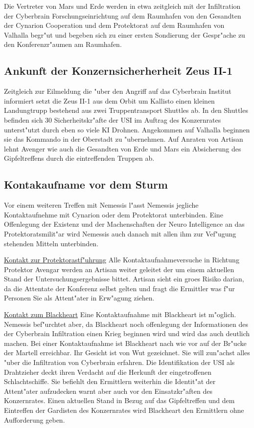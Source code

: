 Die Vertreter von Mars und Erde werden in etwa zeitgleich mit der Infiltration der Cyberbrain Forschungseinrichtung auf dem Raumhafen von den Gesandten der Cynarion Cooperation und dem Protektorat auf dem Raumhafen von Valhalla begr"u\3t und begeben sich zu einer ersten Sondierung der Gespr"ache zu den Konferenzr"aumen am Raumhafen.

\subsection{Ankunft der Konzernsicherherheit Zeus II-1}

Zeitgleich zur Eilmeldung die "uber den Angriff auf das Cyberbrain Institut informiert setzt die Zeus II-1 aus dem Orbit um Kallisto einen kleinen Landungtrupp bestehend aus zwei Truppentransport Shuttles ab. In den Shuttles befinden sich 30 Sicherheitskr"afte der USI im Auftrag des Konzernrates unterst"utzt durch eben so viele KI Drohnen. Angekommen auf Valhalla beginnen sie das Kommando in der Oberstadt zu "ubernehmen. Auf Anraten von Artisan lehnt Avenger wie auch die Gesandten von Erde und Mars ein Absicherung des Gipfeltreffens durch die eintreffenden Truppen ab.

\subsection{Kontakaufname vor dem Sturm}

Vor einem weiteren Treffen mit Nemessis l"asst Nemessis jegliche Kontaktaufnehme mit Cynarion oder dem Protektorat unterbinden. Eine Offenlegung der Existenz und der Machenschaften der Neuro Intelligence an das Protektoratsmilit"ar wird Nemessis auch danach mit allen ihm zur Vef"ugung stehenden Mitteln unterbinden.

\underline{Kontakt zur Protektorastf"uhrung} Alle Kontaktaufnahmeversuche in Richtung Protektor Avengar werden an Artisan weiter geleitet der um einem aktuellen Stand der Untersuchungsergebnisse bittet. Artisan sieht ein gro\3es Risiko darian, da\3 die Attentate der Konferenz selbst gelten und fragt die Ermittler was f"ur Personen Sie als Attent"ater in Erw"agung ziehen.

\underline{Kontakt zum Blackheart} Eine Kontaktaufnahme mit Blackheart ist m"oglich. Nemessis bef"urchtet aber, da\3 Blackheart noch offenlegung der Informationen des der Cyberbrain Infiltration einen Krieg beginnen wird und wird das auch deutlich machen. Bei einer Kontaktaufnahme ist Blackheart nach wie vor auf der Br"ucke der Martell erreichbar. Ihr Gesicht ist von Wut gezeichnet. Sie will zun"achst alles "uber die Infiltration von Cyberbrain erfahren. Die Identifikation der USI als Drahtzieher deckt ihren Verdacht auf die Herkunft der eingetroffenen Schlachtschiffe. Sie befiehlt den Ermittlern weiterhin die Identit"at der Attent"ater aufzudecken warnt aber auch vor den Einsatzkr"aften des Konzernrates. Einen aktuellen Stand in Bezug auf das Gipfeltreffen und dem Eintreffen der Gardisten des Konzernrates wird Blackheart den Ermittlern ohne Aufforderung geben.

